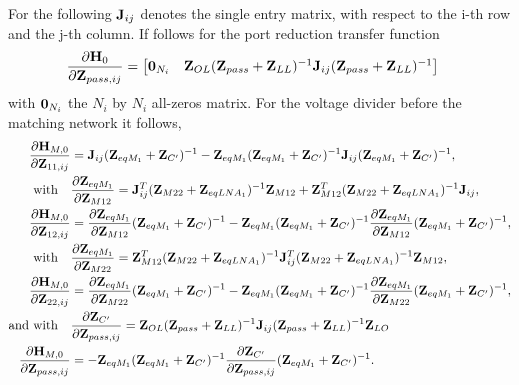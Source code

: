 For the following $\mathbf{J}_{ij}$ denotes the single entry matrix, with respect to the i-th row and the j-th column.
If follows for the port reduction transfer function
\begin{align}
\label{eq:H0_sig_grad}
\frac{\partial\mathbf{H}_{0}}{\partial\mathbf{Z}_{pass,ij}}&=
\begin{bmatrix}
\mathbf{0}_{N_i} & \mathbf{Z}_{OL}(\mathbf{Z}_{pass}+\mathbf{Z}_{LL})^{-1}\mathbf{J}_{ij}(\mathbf{Z}_{pass}+\mathbf{Z}_{LL})^{-1}
\end{bmatrix}
\end{align}
with $\mathbf{0}_{N_i}$ the $N_i$ by $N_i$ all-zeros matrix.
For the voltage divider before the matching network it follows,
\begin{align}
\label{eq:HM0_sig_grad}
\frac{\partial\mathbf{H}_{M,0}}{\partial\mathbf{Z}_{11,ij}}&=
\mathbf{J}_{ij}(\mathbf{Z}_{eqM_1} + \mathbf{Z}_{C'})^{-1} - \mathbf{Z}_{eqM_1}(\mathbf{Z}_{eqM_1} + \mathbf{Z}_{C'})^{-1}\mathbf{J}_{ij}(\mathbf{Z}_{eqM_1} + \mathbf{Z}_{C'})^{-1},\\\nonumber
\text{with}\quad&\frac{\partial\mathbf{Z}_{eqM_1}}{\partial\mathbf{Z}_{M12}} = \mathbf{J}_{ij}^T(\mathbf{Z}_{M22} + \mathbf{Z}_{eqLNA_1})^{-1}\mathbf{Z}_{M12} + \mathbf{Z}_{M12}^T(\mathbf{Z}_{M22} + \mathbf{Z}_{eqLNA_1})^{-1}\mathbf{J}_{ij},\\
\frac{\partial\mathbf{H}_{M,0}}{\partial\mathbf{Z}_{12,ij}}&=
\frac{\partial\mathbf{Z}_{eqM_1}}{\partial\mathbf{Z}_{M12}}(\mathbf{Z}_{eqM_1} + \mathbf{Z}_{C'})^{-1} -
\mathbf{Z}_{eqM_1}(\mathbf{Z}_{eqM_1} + \mathbf{Z}_{C'})^{-1}\frac{\partial\mathbf{Z}_{eqM_1}}{\partial\mathbf{Z}_{M12}}(\mathbf{Z}_{eqM_1} + \mathbf{Z}_{C'})^{-1},\\\nonumber
\text{with}\quad&\frac{\partial\mathbf{Z}_{eqM_1}}{\partial\mathbf{Z}_{M22}} = \mathbf{Z}_{M12}^T(\mathbf{Z}_{M22} + \mathbf{Z}_{eqLNA_1})^{-1}\mathbf{J}_{ij}^T(\mathbf{Z}_{M22} + \mathbf{Z}_{eqLNA_1})^{-1}\mathbf{Z}_{M12},\\
\frac{\partial\mathbf{H}_{M,0}}{\partial\mathbf{Z}_{22,ij}}&=
\frac{\partial\mathbf{Z}_{eqM_1}}{\partial\mathbf{Z}_{M22}}(\mathbf{Z}_{eqM_1} + \mathbf{Z}_{C'})^{-1} -
\mathbf{Z}_{eqM_1}(\mathbf{Z}_{eqM_1} + \mathbf{Z}_{C'})^{-1}\frac{\partial\mathbf{Z}_{eqM_1}}{\partial\mathbf{Z}_{M22}}(\mathbf{Z}_{eqM_1} + \mathbf{Z}_{C'})^{-1},\\\nonumber
\text{and with}\quad&\frac{\partial\mathbf{Z}_{C'}}{\partial\mathbf{Z}_{pass,ij}} = 
\mathbf{Z}_{OL}(\mathbf{Z}_{pass}+\mathbf{Z}_{LL})^{-1}\mathbf{J}_{ij}(\mathbf{Z}_{pass}+\mathbf{Z}_{LL})^{-1}\mathbf{Z}_{LO}\\
\frac{\partial\mathbf{H}_{M,0}}{\partial\mathbf{Z}_{pass,ij}}&=
-\mathbf{Z}_{eqM_1}(\mathbf{Z}_{eqM_1} + \mathbf{Z}_{C'})^{-1}\frac{\partial\mathbf{Z}_{C'}}{\partial\mathbf{Z}_{pass,ij}}(\mathbf{Z}_{eqM_1} + \mathbf{Z}_{C'})^{-1}.
\end{align}
